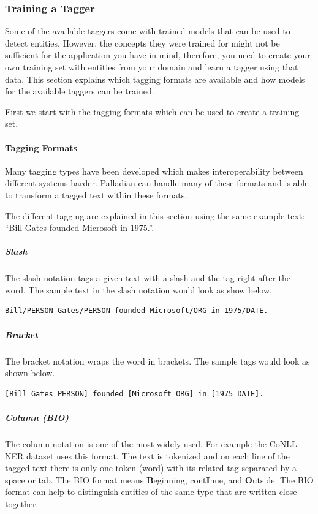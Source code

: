 \documentclass[a4paper,twoside]{book}      %
\begin{document}
\subsubsection{Training a Tagger}

Some of the available taggers come with trained models that can be used to detect entities. However, the concepts they were trained for might not be sufficient for the application you have in mind, therefore, you need to create your own training set with entities from your domain and learn a tagger using that data. This section explains which tagging formats are available and how models for the available taggers can be trained.

First we start with the tagging formats which can be used to create a training set.

\paragraph{Tagging Formats}
Many tagging types have been developed which makes interoperability between different systems harder. Palladian can handle many of these formats and is able to transform a tagged text within these formats. 

The different tagging are explained in this section using the same example text: ``Bill Gates founded Microsoft in 1975.''.

\subparagraph{Slash} The slash notation tags a given text with a slash and the tag right after the word. The sample text in the slash notation would look as show below.

\begin{verbatim}
Bill/PERSON Gates/PERSON founded Microsoft/ORG in 1975/DATE.
\end{verbatim}

\subparagraph{Bracket} The bracket notation wraps the word in brackets. The sample tags would look as shown below.

\begin{verbatim}
[Bill Gates PERSON] founded [Microsoft ORG] in [1975 DATE].
\end{verbatim}

\subparagraph{Column (BIO)} The column notation is one of the most widely used. For example the CoNLL NER dataset uses this format. The text is tokenized and on each line of the tagged text there is only one token (word) with its related tag separated by a space or tab. The BIO format means {\textbf B}eginning, cont{\textbf I}nue, and {\textbf O}utside. The BIO format can help to distinguish entities of the same type that are written close together.
\end{document}
